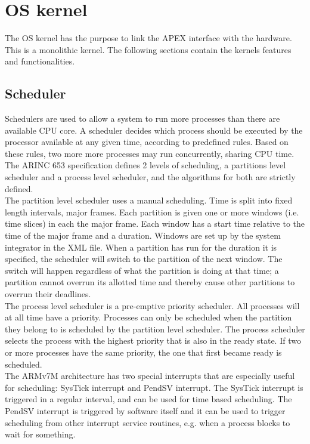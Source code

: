 \section{OS kernel}
The OS kernel has the purpose to link the APEX interface with the hardware.
This is a monolithic kernel. The following sections contain
the kernel\textquotesingle s features and functionalities.

\subsection{Scheduler}
\label{ssec:design_scheduling}
Schedulers are used to allow a system to run more processes than there are
available CPU core. 
A scheduler decides which process should be executed by the processor available
at any given time, according to predefined rules. Based on these rules, two more
more processes may run concurrently, sharing CPU time. The ARINC 653
specification defines 2 levels of scheduling, a partitions level scheduler and a
process level scheduler, and the algorithms for both are strictly defined.\\

The partition level scheduler uses a manual scheduling. Time is split into fixed
length intervals, major frames. Each partition is given one or more windows
(i.e. time slices) in each the major frame. Each window has a start time
relative to the time of the major frame and a duration. Windows are set up by
the system integrator in the XML file.\cite{arinc_part_scheduling}
When a partition has run for the duration it is specified, the scheduler will
switch to the partition of the next window. The switch will happen regardless of
what the partition is doing at that time; a partition cannot overrun its
allotted time and thereby cause other partitions to overrun their deadlines.\\

The process level scheduler is a pre-emptive priority scheduler. All processes 
will at all time have a priority. Processes can only be scheduled when the
partition they belong to is scheduled by the partition level scheduler. The
process scheduler selects the process with the highest priority that is also
in the ready state. If two or more processes have the same priority, the one
that first became ready is scheduled.\cite{arinc_pro_scheduling}\\

The ARMv7M architecture has two special interrupts that are especially useful
for scheduling: SysTick interrupt and PendSV interrupt. The SysTick interrupt is
triggered in a regular interval, and can be used for time based scheduling. The
PendSV interrupt is triggered by software itself and it can be used to trigger 
scheduling from other interrupt service routines, e.g. when a process blocks to
wait for something.

